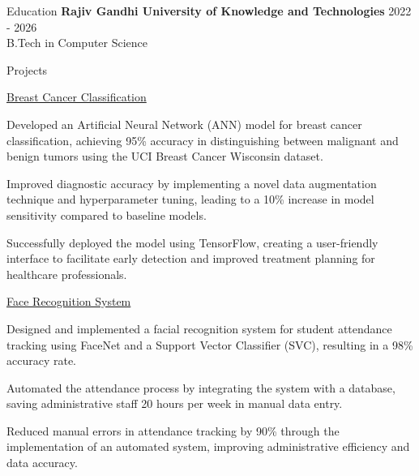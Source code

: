 \documentclass{resume} %
\begin{document}
\begin{rSection}{Education}
                        \textbf{Rajiv Gandhi University of Knowledge and Technologies} \hfill {2022 - 2026} \\
                            {B.Tech in Computer Science}
                         
             
         
    \end{rSection}

    \begin{rSection}{Projects}
                    \begin{rSubsection}
                                    {\href{Github Link}{Breast Cancer Classification}}
                                {}{}{}
                                    \item Developed an Artificial Neural Network (ANN) model for breast cancer classification, achieving 95\% accuracy in distinguishing between malignant and benign tumors using the UCI Breast Cancer Wisconsin dataset.
                                    \item Improved diagnostic accuracy by implementing a novel data augmentation technique and hyperparameter tuning, leading to a 10\% increase in model sensitivity compared to baseline models.
                                    \item Successfully deployed the model using TensorFlow, creating a user-friendly interface to facilitate early detection and improved treatment planning for healthcare professionals.
                            \end{rSubsection}
                    \begin{rSubsection}
                                    {\href{Github Link}{Face Recognition System}}
                                {}{}{}
                                    \item Designed and implemented a facial recognition system for student attendance tracking using FaceNet and a Support Vector Classifier (SVC), resulting in a 98\% accuracy rate.
                                    \item Automated the attendance process by integrating the system with a database, saving administrative staff 20 hours per week in manual data entry.
                                    \item Reduced manual errors in attendance tracking by 90\% through the implementation of an automated system, improving administrative efficiency and data accuracy.

\end{rSubsection}
\end{rSection}
\end{document}
